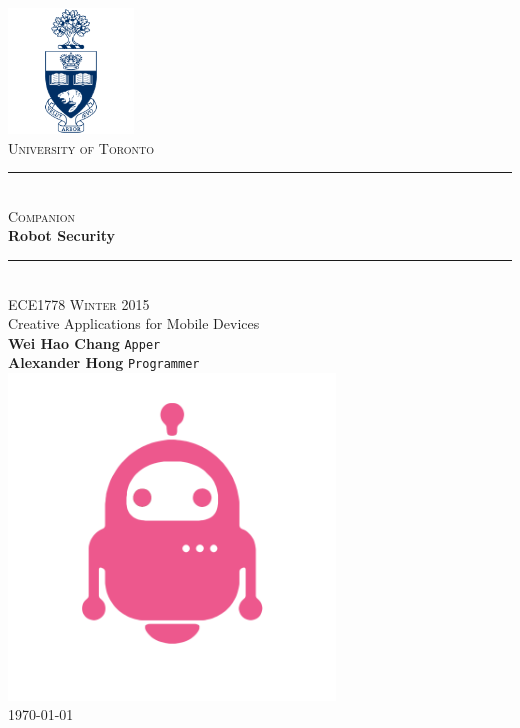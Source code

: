 \newcommand{\HRule}{\rule{\linewidth}{0.5mm}}
\begin{titlepage}
\begin{center}
\includegraphics[width=0.25\textwidth]{./logo.png}~\\[0.3cm]

\textsc{\large University of Toronto}\\[0.5cm]
\HRule \\[0.2cm]
{ \textsc{\large Companion}\\
\LARGE \bfseries Robot Security \\[0.2cm] }
\HRule \\[0.5cm]

\textsc{\large ECE1778 Winter 2015}\\
{Creative Applications for Mobile Devices}\\[0.5cm]
\textbf{\large Wei Hao Chang} \texttt{Apper}\\
\textbf{\large Alexander Hong} \texttt{Programmer}\\
\includegraphics[width=0.65\textwidth]{./companion.png}~\\
\vfill
{\large \today}

\end{center}
\end{titlepage}